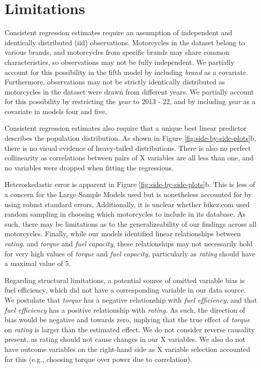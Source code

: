 \documentclass[
]{article}
\begin{document}
\hypertarget{limitations}{%
\section{Limitations}\label{limitations}}

Consistent regression estimates require an assumption of independent and
identically distributed (iid) observations. Motorcycles in the dataset
belong to various brands, and motorcycles from specific brands may share
common characteristics, so observations may not be fully independent. We
partially account for this possibility in the fifth model by including
\emph{brand} as a covariate. Furthermore, observations may not be strictly
identically distributed as motorcycles in the dataset were drawn from
different years. We partially account for this possibility by
restricting the \emph{year} to 2013 - 22, and by including \emph{year} as a
covariate in models four and five.

Consistent regression estimates also require that a unique best linear
predictor describes the population distribution. As shown in Figure
\ref{fig:side-by-side-plots}b, there is no visual evidence of
heavy-tailed distributions. There is also no perfect collinearity as
correlations between pairs of X variables are all less than one, and no
variables were dropped when fitting the regressions.

Heteroskedastic error is apparent in Figure
\ref{fig:side-by-side-plots}b. This is less of a concern for the Large
Sample Models used but is nonetheless accounted for by using robust
standard errors. Additionally, it is unclear whether bikez.com used
random sampling in choosing which motorcycles to include in its
database. As such, there may be limitations as to the generalizeability
of our findings across all motorcycles. Finally, while our models
identified linear relationships between \emph{rating}. and \emph{torque} and \emph{fuel
capacity}, these relationships may not necessarily hold for very high
values of \emph{torque} and \emph{fuel capacity}, particularly as \emph{rating} should
have a maximal value of 5.

Regarding structural limitations, a potential source of omitted variable
bias is fuel efficiency, which did not have a corresponding variable in
our data source. We postulate that \emph{torque} has a negative relationship
with \emph{fuel efficiency}, and that \emph{fuel efficiency} has a positive
relationship with \emph{rating}. As such, the direction of bias would be
negative and towards zero, implying that the true effect of \emph{torque} on
\emph{rating} is larger than the estimated effect. We do not consider reverse
causality present, as rating should not cause changes in our X
variables. We also do not have outcome variables on the right-hand side
as X variable selection accounted for this (e.g., choosing torque over
power due to correlation).
\end{document}
